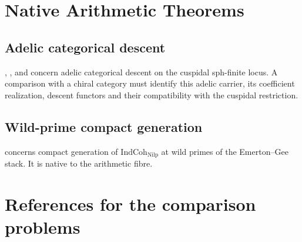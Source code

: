 \section{Native Arithmetic Theorems}
\label{v4-arith:w6-i:orthogonals}

\subsection{Adelic categorical descent}

,
, and
 concern adelic categorical
descent on the cuspidal sph-finite locus. A comparison with a
chiral category must identify this adelic carrier, its coefficient
realization, descent functors and their compatibility with the
cuspidal restriction.

\subsection{Wild-prime compact generation}

 concerns compact generation of
\(\mathrm{IndCoh}_{\mathrm{Nilp}}\) at wild primes of the
Emerton--Gee stack.  It is native to the arithmetic fibre.

\section{References for the comparison problems}
\label{v4-arith:w6-i:disjointness-table}

